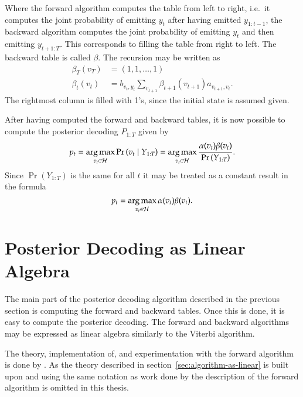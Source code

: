 Where the forward algorithm computes the table from left to right, i.e.\
it computes the joint probability of emitting $y_t$ after having emitted
$y_{1:t-1}$, the backward algorithm computes the joint probability of emitting
$y_t$ and then emitting $y_{t+1:T}$. This corresponds to filling the table from
right to left. The backward table is called $\beta$. The recursion may be written as
\begin{equation}
  \label{eq:9}
  \begin{aligned}
    \beta_T(v_T) &= (1, 1, \dots, 1) \\
    \beta_t(v_t) &= b_{v_t, y_t} \sum_{v_{t + 1}} \beta_{t + 1}(v_{t + 1})
    a_{v_{t + 1}, v_t}.
  \end{aligned}
\end{equation}
The rightmost column is filled with 1's, since the initial state is assumed
given.

After having computed the forward and backward tables, it is now possible to
compute the posterior decoding $P_{1:T}$ given by
\begin{equation*}
  p_t = \operatorname*{arg\,max}_{v_t \in \mathcal{H}} \Pr \left(v_t \mid Y_{1:T} \right) =
  \operatorname*{arg\,max}_{v_t \in \mathcal{H}} \frac{\alpha(v_t) \beta(v_t)}{\Pr \left( Y_{1:T} \right)}.
\end{equation*}
Since $\Pr ( Y_{1:T} )$ is the same for all $t$ it may be treated as
a constant result in the formula
\begin{equation}
  \label{eq:6}
  p_t = \operatorname*{arg\,max}_{v_t \in \mathcal{H}} \alpha(v_t) \beta(v_t).
\end{equation}

\section{Posterior Decoding as Linear Algebra}

The main part of the posterior decoding algorithm described in the previous
section is computing the forward and backward tables. Once this is done, it is
easy to compute the posterior decoding. The forward and backward algorithms may
be expressed as linear algebra similarly to the Viterbi algorithm.

The theory, implementation of, and experimentation with the forward algorithm
is done by \citet{sand2013ziphmmlib}. As the theory described in
section~\ref{sec:algorithm-as-linear} is built upon and using the same notation
as work done by \citet{sand2013ziphmmlib} the description of the forward
algorithm is omitted in this thesis.

